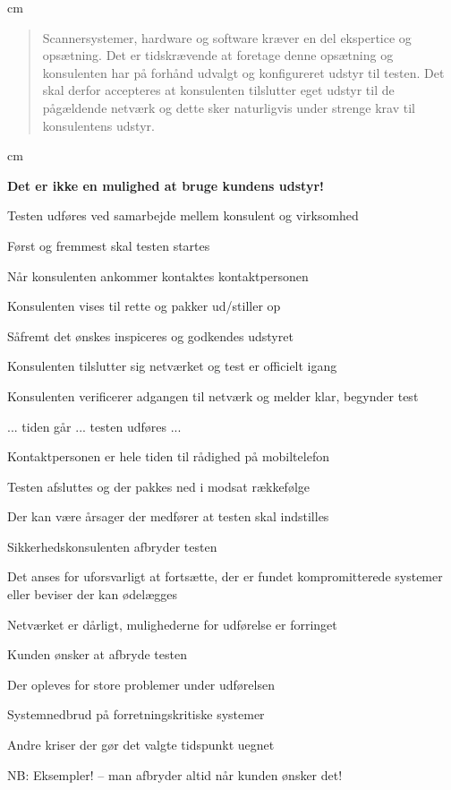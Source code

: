 \documentclass[20pt,landscape,a4paper,footrule]{foils}
\begin{document}

 cm
\begin{quote}
Scannersystemer, hardware og software kræver en del ekspertice og
opsætning. Det er tidskrævende at foretage denne opsætning og
konsulenten har på forhånd udvalgt og konfigureret udstyr til testen.
Det skal derfor accepteres at konsulenten tilslutter eget udstyr til
de pågældende netværk og dette sker naturligvis under strenge krav til
konsulentens udstyr.
\end{quote}
 cm
\centerline{\bf Det er ikke en mulighed at bruge kundens udstyr!}


\begin{list1}
\item Testen udføres ved samarbejde mellem konsulent og virksomhed
\item Først og fremmest skal testen startes
\begin{list2}
\item Når konsulenten ankommer kontaktes kontaktpersonen
\item Konsulenten vises til rette og pakker ud/stiller op
\item Såfremt det ønskes inspiceres og godkendes udstyret
\item Konsulenten tilslutter sig netværket og test er officielt igang
\item Konsulenten verificerer adgangen til netværk og melder klar,
  begynder test
\end{list2}
\item ... tiden går ... testen udføres ...
\item Kontaktpersonen er hele tiden til rådighed på mobiltelefon
\item Testen afsluttes og der pakkes ned i modsat rækkefølge
\end{list1}



\begin{list1}
\item Der kan være årsager der medfører at testen skal indstilles
\item Sikkerhedskonsulenten afbryder testen
\begin{list2}
\item Det anses for uforsvarligt at fortsætte, der er fundet
  kompromitterede systemer eller beviser der kan ødelægges
\item Netværket er dårligt, mulighederne for udførelse er forringet
\end{list2}
\item Kunden ønsker at afbryde testen
\begin{list2}
\item Der opleves for store problemer under udførelsen
\item Systemnedbrud på forretningskritiske systemer
\item Andre kriser der gør det valgte tidspunkt uegnet
\end{list2}
\item NB: Eksempler! -- man afbryder altid når kunden ønsker det!
\end{list1}
\end{document}
